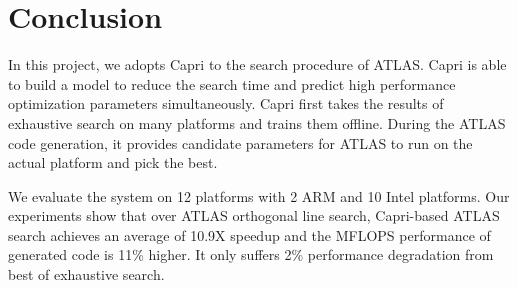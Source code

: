 \section{Conclusion}
\label{sec:conclusion}


In this project, we adopts Capri to the search procedure of ATLAS. 
Capri is able to build a model to reduce the search time and predict high performance optimization parameters simultaneously.
Capri first takes the results of exhaustive search on many platforms and trains them offline. 
During the ATLAS code generation, it provides candidate parameters for ATLAS to run on the actual platform and pick the best.
\par
We evaluate the system on 12 platforms with 2 ARM and 10 Intel platforms. Our experiments show that over ATLAS orthogonal line search, Capri-based ATLAS search achieves an average of 10.9X speedup and the MFLOPS performance of generated code is 11\% higher. It only suffers 2\% performance degradation from best of exhaustive search.
